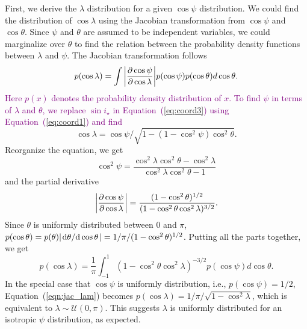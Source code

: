 \documentclass[twocolumn,times]{aastex631}
\newcommand{\edits}[1]{\textcolor{purple}{#1}}
\begin{document}
First, we derive the $\lambda$ distribution for a given $\cos{\psi}$ distribution. We could find the distribution of $\cos{\lambda}$ using the Jacobian transformation from $\cos{\psi}$ and $\cos{\theta}$. Since $\psi$ and $\theta$ are assumed to be independent variables, we could marginalize over $\theta$ to find the relation between the probability density functions between $\lambda$ and $\psi$.
The Jacobian transformation follows
\begin{equation}
    p(\cos{\lambda}) = \int \abs{\pdv{\cos{\psi}}{\cos{\lambda}}} p(\cos{\psi}) p(\cos{\theta}) d\cos{\theta}.
\end{equation}
\edits{Here $p(x)$ denotes the probability density distribution of $x$.
To find $\psi$ in terms of $\lambda$ and $\theta$, we replace $\sin{i_\star}$ in Equation~(\ref{eq:coord3}) using Equation~(\ref{eq:coord1}) and find}
\begin{equation}
    \cos{\lambda} = \cos{\psi}/\sqrt{1-(1-\cos^2{\psi})\cos^2{\theta}}.
\end{equation} 
Reorganize the equation, we get 
\begin{equation}
    \cos^2{\psi} = \frac{\cos^2{\lambda}\cos^2{\theta}-\cos^2{\lambda}}{\cos^2{\lambda}\cos^2{\theta}-1}
\end{equation}
and the partial derivative 
\begin{equation}
    \abs{\pdv{\cos{\psi}}{\cos{\lambda}}} = \frac{(1-\cos^2{\theta})^{1/2}}{(1-\cos^2{\theta}\cos^2{\lambda})^{3/2}}.
\end{equation}
Since $\theta$ is uniformly distributed between $0$ and $\pi$, $p(\cos{\theta}) = p(\theta) \abs{\dv*{\theta}{\cos{\theta}}} = 1/\pi/(1-\cos^2{\theta)^{1/2}}$. Putting all the parts together, we get
\begin{equation}\label{eqn:jac_lam}
    p(\cos{\lambda}) = \frac{1}{\pi} \int_{-1}^{1} (1-\cos^2{\theta}\cos^2{\lambda})^{-3/2} p(\cos{\psi}) d\cos{\theta}.
\end{equation}
In the special case that $\cos{\psi}$ is uniformly distribution, i.e., $p(\cos{\psi}) = 1/2$, Equation~(\ref{eqn:jac_lam}) becomes $p(\cos{\lambda}) = 1/\pi/\sqrt{1-\cos^2{\lambda}}$, which is equivalent to $\lambda \sim \mathcal{U}(0, \pi)$. This suggests $\lambda$ is uniformly distributed for an isotropic $\psi$ distribution, as expected.
\end{document}
